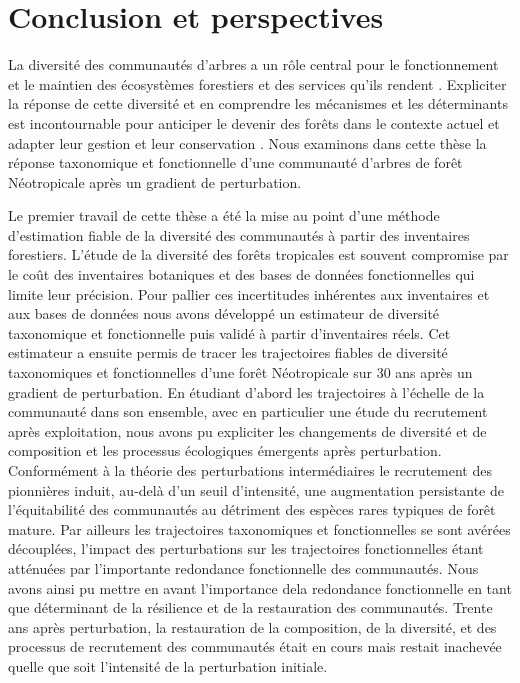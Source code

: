 \documentclass[
  11pt,
  french,
  A4paper,
  extrafontsizes,onecolumn,openright
  ]{memoir}
\begin{document}
\chapter{Conclusion et perspectives}\label{conclusion-et-perspectives}

La diversité des communautés d'arbres a un rôle central pour le
fonctionnement et le maintien des écosystèmes forestiers et des services
qu'ils rendent \autocite{Liang2016}. Expliciter la réponse de cette
diversité et en comprendre les mécanismes et les déterminants est
incontournable pour anticiper le devenir des forêts dans le contexte
actuel et adapter leur gestion et leur conservation
\autocite{Barlow2018}. Nous examinons dans cette thèse la réponse
taxonomique et fonctionnelle d'une communauté d'arbres de forêt
Néotropicale après un gradient de perturbation.

Le premier travail de cette thèse a été la mise au point d'une méthode
d'estimation fiable de la diversité des communautés à partir des
inventaires forestiers. L'étude de la diversité des forêts tropicales
est souvent compromise par le coût des inventaires botaniques et des
bases de données fonctionnelles qui limite leur précision. Pour pallier
ces incertitudes inhérentes aux inventaires et aux bases de données nous
avons développé un estimateur de diversité taxonomique et fonctionnelle
puis validé à partir d'inventaires réels. Cet estimateur a ensuite
permis de tracer les trajectoires fiables de diversité taxonomiques et
fonctionnelles d'une forêt Néotropicale sur 30 ans après un gradient de
perturbation. En étudiant d'abord les trajectoires à l'échelle de la
communauté dans son ensemble, avec en particulier une étude du
recrutement après exploitation, nous avons pu expliciter les changements
de diversité et de composition et les processus écologiques émergents
après perturbation. Conformément à la théorie des perturbations
intermédiaires le recrutement des pionnières induit, au-delà d'un seuil
d'intensité, une augmentation persistante de l'équitabilité des
communautés au détriment des espèces rares typiques de forêt mature. Par
ailleurs les trajectoires taxonomiques et fonctionnelles se sont avérées
découplées, l'impact des perturbations sur les trajectoires
fonctionnelles étant atténuées par l'importante redondance fonctionnelle
des communautés. Nous avons ainsi pu mettre en avant l'importance dela
redondance fonctionnelle en tant que déterminant de la résilience et de
la restauration des communautés. Trente ans après perturbation, la
restauration de la composition, de la diversité, et des processus de
recrutement des communautés était en cours mais restait inachevée quelle
que soit l'intensité de la perturbation initiale.
\end{document}
